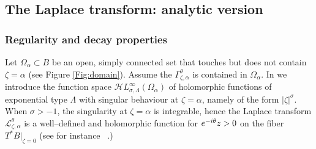 \documentclass{article}
\let\Re\relax
\DeclareMathOperator{\Re}{Re}
\newcommand{\singexp}[2]{\mathcal{H}L^\infty_{#1, #2}}
\theoremstyle{definition}
\newcommand{\laplace}{\mathcal{L}}
\theoremstyle{plain}
\begin{document}
\subsection{The Laplace transform: analytic version}\label{sec:laplace_analytic}
\subsubsection{Regularity and decay properties}\label{reg-decay}
%
Let $\Omega_\alpha\subset B$ be an open, simply connected set that touches but does not contain $\zeta=\alpha$ (see Figure \ref{Fig:domain}). Assume the $\Gamma_{\zeta,\alpha}^\theta$ is contained in $\Omega_\alpha$. In \cite{reg-sing-volterra} we introduce the function space $\singexp{\sigma}{\Lambda}(\Omega_\alpha)$ of holomorphic functions of exponential type $\Lambda$ with singular behaviour at $\zeta=\alpha$, namely of the form $|\zeta|^\sigma$. When $\sigma>-1$, the singularity at $\zeta=\alpha$ is integrable, hence the Laplace transform $\laplace_{\zeta,\alpha}^\theta$ is a well--defined and holomorphic function for $\Re e^{-i\theta}z>0$ on the fiber $T^*B\vert_{\zeta=0}$ (see for instance ~\cite[Section  5.6]{diverg-resurg-i}.)    
\end{document}
